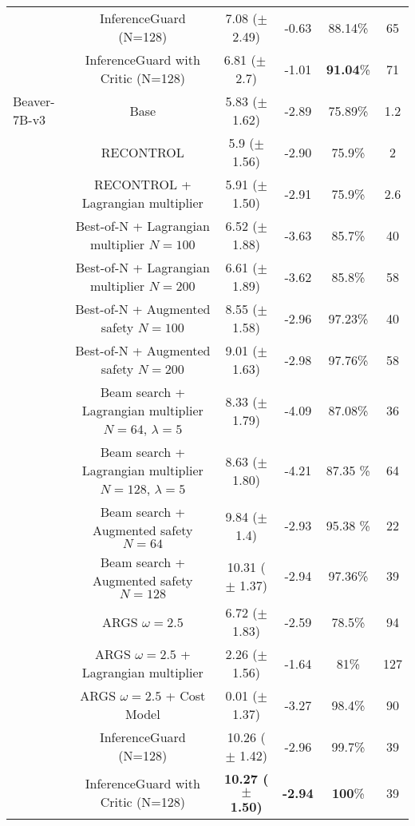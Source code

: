 \begin{table}[h!]
{\begin{tabular}{lccccc}
               & InferenceGuard (N=128) & 7.08 ($\pm$ 2.49) & -0.63 & 88.14\% & 65\\
               & InferenceGuard with Critic (N=128)  & 6.81 ($\pm\ $2.7) & -1.01 & \textbf{91.04}\% & 71 \\ 
               \midrule %
    Beaver-7B-v3 & Base & 5.83 ($\pm$ 1.62) & -2.89 & 75.89\% & 1.2  \\
                & RECONTROL & 5.9 ($\pm$ 1.56) & -2.90 & 75.9\% & 2  \\
                & RECONTROL + Lagrangian multiplier & 5.91 ($\pm$ 1.50) & -2.91 & 75.9\% & 2.6  \\
                & Best-of-N + Lagrangian multiplier $N=100$ & 6.52 ($\pm$ 1.88) & -3.63 & 85.7\% & 40\\
                & Best-of-N + Lagrangian multiplier $N=200$ & 6.61 ($\pm$ 1.89) & -3.62 & 85.8\% & 58 \\
                &  Best-of-N + Augmented safety $N=100$ & 8.55 ($\pm$ 1.58) & -2.96 & 97.23\% & 40 \\
                &  Best-of-N + Augmented safety $N=200$ & 9.01 ($\pm$ 1.63) & -2.98 & 97.76\% & 58 \\
                & Beam search + Lagrangian multiplier $N=64$, $\lambda = 5$ & 8.33 ($\pm$ 1.79) & -4.09 & 87.08\% & 36 \\
                & Beam search + Lagrangian multiplier $N=128$, $\lambda = 5$ & 8.63 ($\pm$ 1.80) & -4.21 & 87.35 \% & 64 \\
                 & Beam search + Augmented safety $N=64$ & 9.84 ($\pm$ 1.4) & -2.93 & 95.38 \% & 22 \\
                & Beam search + Augmented safety $N=128$ & 10.31 ($\pm$ 1.37) & -2.94 & 97.36\% & 39 \\ 
                & ARGS $\omega=2.5$ & 6.72 ($\pm$ 1.83) & -2.59 & 78.5\% & 94 \\
                & ARGS $\omega=2.5$ + Lagrangian multiplier & 2.26 ($\pm$ 1.56) & -1.64 & 81\% & 127 \\
                & ARGS $\omega=2.5$ + Cost Model & 0.01 ($\pm$ 1.37) & -3.27 & 98.4\% & 90 \\
                & InferenceGuard (N=128) & 10.26 ($\pm$ 1.42) & -2.96 & 99.7\% &39 \\
                & InferenceGuard with Critic (N=128) & \textbf{10.27 ($\pm$ 1.50)} & \textbf{-2.94} & \textbf{100}\% & 39 \\
     \bottomrule
 \end{tabular}%
}
\end{table}


